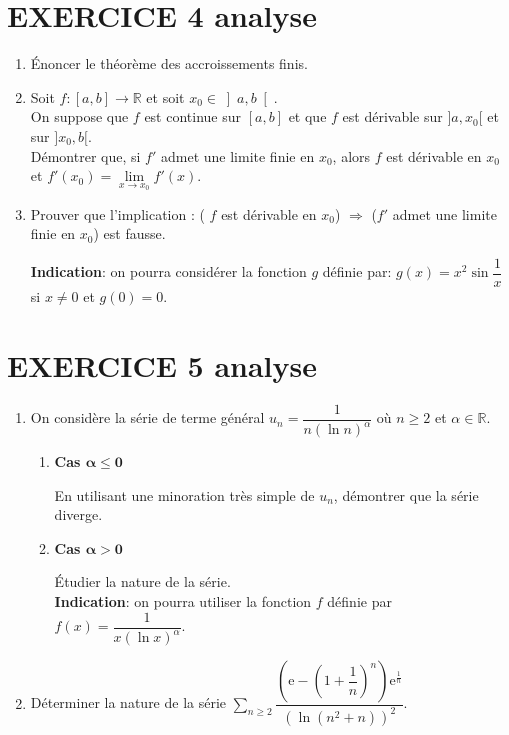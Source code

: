 \documentclass[10pt,oneside]{article}
\begin{document}
\begin{flushleft}
\section*{EXERCICE 4 \:analyse  }

\begin{enumerate}
\item \'Enoncer le théorème des accroissements finis.
\item Soit $f:\left[ a,b\right]\longrightarrow \mathbb{R} $ et 
soit $x_0\in \left]a,b \right[ $.\\
On suppose que $f$ est continue sur $[a,b]$ et  que $f$ est dérivable sur $]a,x_0[$ et sur $]x_0,b[$.\\
Démontrer que,  si $f'$ admet une limite finie en $x_0$,  alors 
 $f$ est dérivable en $x_0$ et $f'(x_0)=\lim\limits_{x\rightarrow x_0}f'(x)$.
\item Prouver que l'implication :\: ( $f$ est dérivable en $x_0$) $\Longrightarrow$ ($f'$ admet une limite finie en $x_0$) est fausse.

\textbf{Indication}: on pourra considérer la fonction $g$ définie par: $g(x)=x^2\sin\dfrac{1}{x}$ si $x\not=0$ et $g(0)=0$.
\end{enumerate}


\section*{EXERCICE 5 \:analyse }

\begin{enumerate}

\item
On considère la s\'{e}rie de terme g\'{e}n\'{e}ral $u_{n}=\dfrac{1}{n\left( \ln n\right) ^{\alpha }}$ o\`{u} $n\geqslant 2$ et $\alpha \in \mathbb{R}$.\medskip


\begin{enumerate}
\item \textbf{Cas $\bm{\alpha \leqslant 0}$}\medskip

En utilisant une minoration tr\`{e}s simple de $u_{n}$, démontrer que la série diverge.

\item \textbf{Cas $\bm{\alpha >0}$}\medskip 

\'Etudier la nature de la série.\\ 
\textbf{Indication}: on pourra utiliser la fonction $f$ d\'{e}finie par $f(x) =\dfrac{1}{x(\ln x) ^{\alpha }}$.
\end{enumerate}
\item
Déterminer la nature de la série $\displaystyle\sum\limits_{n\geqslant 2}^{}\dfrac{\left( \mathrm{e}-\left( 1+\dfrac{1}{n}\right)^n \right)\mathrm{e}^{\frac{1}{n}}}{\left( \ln(n^2+n)\right) ^2}$.
\end{enumerate}


\end{flushleft}
\end{document}
